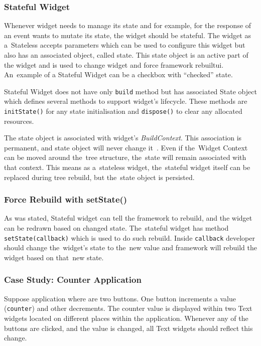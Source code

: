 \subsubsection{Stateful Widget}
Whenever widget needs to manage its state and for example, for the response of an event wants to mutate its state, the widget should be stateful.  The widget as a~Stateless accepts parameters which can be used to configure this widget but also has an associated object, called state. This state object is an active part of the widget and is used to change widget and force framework rebuilt\gls{ui}.  An~example of a Stateful Widget can be a checkbox with ``checked'' state. 

Stateful Widget does not have only \verb|build| method but has associated State object which defines several methods to support widget's lifecycle. These methods are \verb|initState()| for any state initialisation and \verb|dispose()| to clear any allocated resources. 

The state object is associated with widget's \textit{BuildContext}. This association is permanent, and state object will never change it~\cite{notion-widget-didier}. Even if the~Widget Context can be moved around the~tree structure, the~state will remain associated with that context. This means as a~stateless widget, the~stateful widget itself can be replaced during tree rebuild, but the~state object is persisted. 
\subsubsection{Force Rebuild with setState()}
As was stated, Stateful widget can tell the framework to rebuild, and the widget can be redrawn based on changed state. The~stateful widget has method \verb|setState(callback)| which is used to do such rebuild. Inside \verb|callback| developer should change the~widget's state to the~new value and framework will rebuild the widget based on that~new state. 
\subsubsection{Case Study: Counter Application}
Suppose application where are two buttons. One button increments a value (\verb|counter|) and other decrements. The counter value is displayed within two Text widgets located on different places within the application. Whenever any of the buttons are clicked, and the value is changed, all Text widgets should reflect this change.

